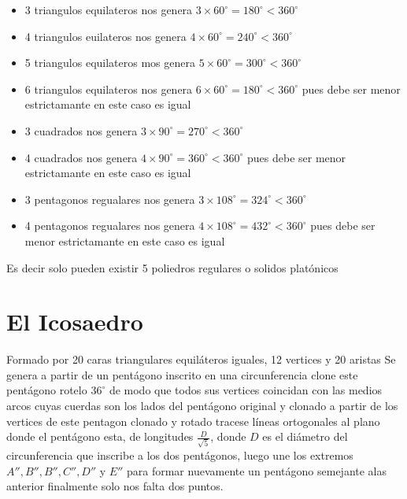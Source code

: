 \begin{itemize}
  \item 3 triangulos equilateros nos genera $3\times 60^\circ=180^\circ < 360^\circ$
  \item 4 triangulos euilateros nos genera $4\times 60^\circ=240^\circ < 360^\circ$
  \item 5 triangulos equilateros mos genera $5\times 60^\circ=300^\circ < 360^\circ$
  \item 6 triangulos equilateros nos genera $6\times 60^\circ=180^\circ < 360^\circ$ pues debe ser menor estrictamante en este caso es igual
  \item 3 cuadrados nos genera $3\times 90^\circ=270^\circ < 360^\circ$
  \item 4 cuadrados nos genera $4\times 90^\circ=360^\circ < 360^\circ$ pues debe ser menor estrictamante en este caso es igual
  \item 3 pentagonos regualares nos genera $3\times 108^\circ=324^\circ < 360^\circ$
  \item 4 pentagonos regualares nos genera $4\times 108^\circ=432^\circ < 360^\circ$ pues debe ser menor estrictamante en este caso es igual
\end{itemize}

 Es decir solo pueden existir  5 poliedros regulares o solidos platónicos

\section{El Icosaedro}
Formado por 20 caras triangulares equiláteros iguales, 12 vertices y 20 aristas
Se genera a partir de un pentágono inscrito en una circunferencia  clone este pentágono rotelo $36^\circ$ de modo que todos sus vertices coincidan con las medios arcos cuyas cuerdas son los lados del pentágono original y clonado  a partir de los vertices de este pentagon clonado y rotado  tracese líneas ortogonales al plano donde el pentágono esta, de longitudes $\frac{D}{\sqrt{5}}$, donde $D$ es el diámetro del circunferencia que inscribe a los dos pentágonos, luego une los extremos $A'',B'',B'',C'',D''$ y $E''$ para formar nuevamente un pentágono semejante alas anterior finalmente solo nos falta dos puntos.


